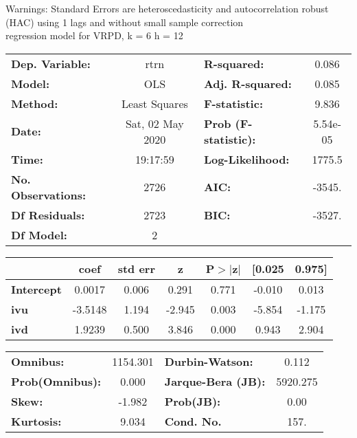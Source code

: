 Warnings: \newline
 [1] Standard Errors are heteroscedasticity and autocorrelation robust (HAC) using 1 lags and without small sample correction\\ 

regression model for VRPD, k = 6 h = 12\begin{center}
\begin{tabular}{lclc}
\toprule
\textbf{Dep. Variable:}    &       rtrn       & \textbf{  R-squared:         } &     0.086   \\
\textbf{Model:}            &       OLS        & \textbf{  Adj. R-squared:    } &     0.085   \\
\textbf{Method:}           &  Least Squares   & \textbf{  F-statistic:       } &     9.836   \\
\textbf{Date:}             & Sat, 02 May 2020 & \textbf{  Prob (F-statistic):} &  5.54e-05   \\
\textbf{Time:}             &     19:17:59     & \textbf{  Log-Likelihood:    } &    1775.5   \\
\textbf{No. Observations:} &        2726      & \textbf{  AIC:               } &    -3545.   \\
\textbf{Df Residuals:}     &        2723      & \textbf{  BIC:               } &    -3527.   \\
\textbf{Df Model:}         &           2      & \textbf{                     } &             \\
\bottomrule
\end{tabular}
\begin{tabular}{lcccccc}
                   & \textbf{coef} & \textbf{std err} & \textbf{z} & \textbf{P$> |$z$|$} & \textbf{[0.025} & \textbf{0.975]}  \\
\midrule
\textbf{Intercept} &       0.0017  &        0.006     &     0.291  &         0.771        &       -0.010    &        0.013     \\
\textbf{ivu}       &      -3.5148  &        1.194     &    -2.945  &         0.003        &       -5.854    &       -1.175     \\
\textbf{ivd}       &       1.9239  &        0.500     &     3.846  &         0.000        &        0.943    &        2.904     \\
\bottomrule
\end{tabular}
\begin{tabular}{lclc}
\textbf{Omnibus:}       & 1154.301 & \textbf{  Durbin-Watson:     } &    0.112  \\
\textbf{Prob(Omnibus):} &   0.000  & \textbf{  Jarque-Bera (JB):  } & 5920.275  \\
\textbf{Skew:}          &  -1.982  & \textbf{  Prob(JB):          } &     0.00  \\
\textbf{Kurtosis:}      &   9.034  & \textbf{  Cond. No.          } &     157.  \\
\bottomrule
\end{tabular}
\end{center}

